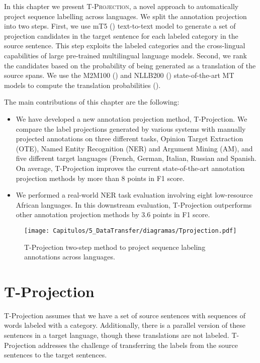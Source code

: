 In this chapter we present \textsc{T-Projection}, a novel approach to automatically project sequence labelling across languages. We split the annotation projection into two steps. First, we use mT5 (\cite{mt5}) text-to-text model to generate a set of projection candidates in the target sentence for each labeled category in the source sentence. This step exploits the labeled categories and the cross-lingual capabilities of large pre-trained multilingual language models. Second, we rank the candidates based on the probability of being generated as a translation of the source spans. We use the M2M100
(\cite{JMLR:v22:20-1307}) and NLLB200 (\cite{DBLP:journals/corr/abs-2207-04672}) state-of-the-art MT models to compute the translation probabilities
(\cite{DBLP:journals/corr/abs-2204-13692}).

The main contributions of this chapter are the following: 
\begin{itemize}
\item We have developed a new annotation projection method, T-Projection. We compare the label projections generated by various systems with manually projected annotations on three different tasks, Opinion Target Extraction (OTE), Named Entity Recognition (NER) and Argument Mining (AM), and five different target languages (French, German, Italian, Russian and Spanish. On average, T-Projection improves the current state-of-the-art annotation projection methods by more than 8 points in F1 score.
\item We performed a real-world NER task evaluation involving eight low-resource African languages. In this downstream evaluation, T-Projection outperforms other annotation projection methods by 3.6 points in F1 score. 
\end{itemize}

\begin{figure}[t]
\centering
\texttt{[image: Capitulos/5\_DataTransfer/diagramas/Tprojection.pdf]}
\caption{T-Projection two-step method to project sequence
labeling annotations across languages.}
\label{fig:Tprojection}
\end{figure} 


\section{T-Projection}
\label{sc4:Tprojection}
T-Projection assumes that we have a set of source sentences with sequences of words labeled with a category. Additionally, there is a parallel version of these sentences in a target language, though these translations are not labeled. T-Projection addresses the challenge of transferring the labels from the source sentences to the target sentences.



